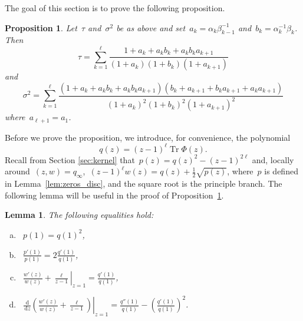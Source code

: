 \documentclass[11pt]{article}
\theoremstyle{plain}
\newtheorem{lemma}[theorem]{Lemma}
\newtheorem{proposition}[theorem]{Proposition}
\theoremstyle{definition}
\numberwithin{equation}{section}
\renewcommand{\d}{\,\mathrm{d}}
\DeclareMathOperator{\Tr}{Tr}
\begin{document}
The goal of this section is to prove the following proposition.
\begin{proposition}\label{prop:exact_values}
Let~$\tau $ and~$\sigma^2$ be as above and set~$a_k=\alpha_k\beta_{k-1}^{-1}$ and~$b_k=\alpha_k^{-1}\beta_k$. Then
\begin{equation}\label{eq:ty_sum}
\tau =
\sum_{k=1}^\ell \frac{1+a_k+a_kb_k+a_kb_ka_{k+1}}
{(1+a_k)(1+b_k)(1+a_{k+1})}
\end{equation}
and
\begin{equation}\label{eq:sigma_sum}
\sigma^2=
\sum_{k=1}^\ell \frac{(1+a_k+a_kb_k+a_kb_ka_{k+1})(b_k+a_{k+1}+b_ka_{k+1}+a_ka_{k+1})}
{(1+a_k)^2(1+b_k)^2(1+a_{k+1})^2}
\end{equation}
where~$a_{\ell+1}=a_1$.
\end{proposition}
%
Before we prove the proposition, we introduce, for convenience, the polynomial
\begin{equation}
q(z)=(z-1)^\ell \Tr \Phi(z).
\end{equation} 
Recall from Section \ref{sec:kernel} that~$p(z)=q(z)^2-(z-1)^{2\ell}$ and, locally around~$(z,w)=q_\infty$,~$(z-1)^\ell w(z)=q(z)+\frac{1}{2}\sqrt{p(z)}$, where~$p$ is defined in Lemma~\ref{lem:zeros_disc}, and the square root is the principle branch. The following lemma will be useful in the proof of Proposition~\ref{prop:exact_values}.
\begin{lemma}\label{lem:pq}
The following equalities hold:
\begin{enumerate}[(a)]
\item~$p(1)=q(1)^2$, \label{eq:pq_1}
\item~$\frac{p'(1)}{p(1)}=2\frac{q'(1)}{q(1)}$, \label{eq:pq_2}
\item~$\left.\frac{w'(z)}{w(z)}+\frac{\ell}{z-1}\right|_{z=1}=\frac{q'(1)}{q(1)}$, \label{eq:pq_3}
\item~$\left.\frac{\d}{\d z}\left(\frac{w'(z)}{w(z)}+\frac{\ell}{z-1}\right)\right|_{z=1}=\frac{q''(1)}{q(1)}-\left(\frac{q'(1)}{q(1)}\right)^2$. \label{eq:pq_4}
\end{enumerate}
\end{lemma}
\end{document}
